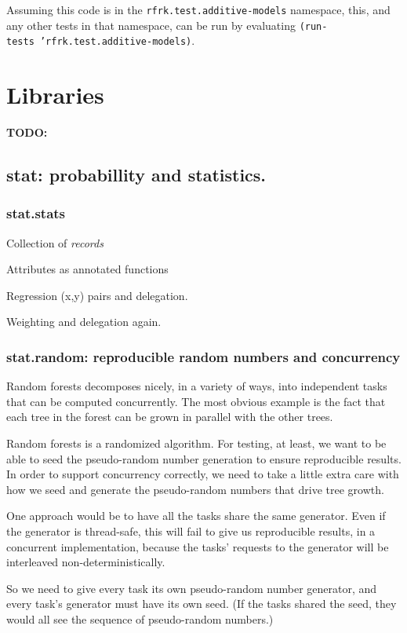 \documentclass[11pt,openany,american,usenames,dvipsnames,svgnames,x11names,table,isodate]{article}
\numberwithin{equation}{section}
\numberwithin{figure}{section}
\begin{document}
Assuming this code is in the \texttt{rfrk.test.additive-models} namespace,
this, and any other tests in that namespace, can be run by evaluating
\texttt{(run-tests~'rfrk.test.additive-models)}.

\newpage{}


\section{\label{sec:Libraries}Libraries}

\textbf{TODO:}


\subsection{stat: probabillity and statistics.}


\subsubsection{stat.stats}

Collection of \emph{records}

Attributes as annotated functions

Regression (x,y) pairs and delegation.

Weighting and delegation again.


\subsubsection{stat.random: reproducible random numbers and concurrency}

Random forests decomposes nicely, in a variety of ways, into independent
tasks that can be computed concurrently. The most obvious example
is the fact that each tree in the forest can be grown in parallel
with the other trees.

Random forests is a randomized algorithm. For testing, at least, we
want to be able to seed the pseudo-random number generation to ensure
reproducible results. In order to support concurrency correctly, we
need to take a little extra care with how we seed and generate the
pseudo-random numbers that drive tree growth.

One approach would be to have all the tasks share the same generator.
Even if the generator is thread-safe, this will fail to give us reproducible
results, in a concurrent implementation, because the tasks' requests
to the generator will be interleaved non-deterministically.

So we need to give every task its own pseudo-random number generator,
and every task's generator must have its own seed. (If the tasks shared
the seed, they would all see the sequence of pseudo-random numbers.)
\end{document}
